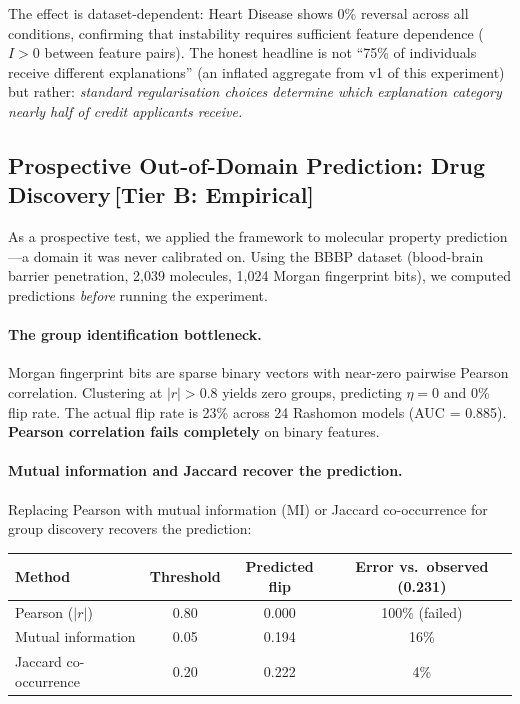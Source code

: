 \documentclass[11pt,a4paper]{article}
\begin{document}
The effect is dataset-dependent: Heart Disease shows 0\% reversal across all conditions, confirming that instability requires sufficient feature dependence ($I > 0$ between feature pairs). The honest headline is not ``75\% of individuals receive different explanations'' (an inflated aggregate from v1 of this experiment) but rather: \emph{standard regularisation choices determine which explanation category nearly half of credit applicants receive.}

\subsection{Prospective Out-of-Domain Prediction: Drug Discovery\,\textnormal{\normalsize[Tier B: Empirical]}}
\label{sec:drug-discovery}

As a prospective test, we applied the framework to molecular property prediction---a domain it was never calibrated on. Using the BBBP dataset (blood-brain barrier penetration, 2{,}039 molecules, 1{,}024 Morgan fingerprint bits), we computed predictions \emph{before} running the experiment.

\paragraph{The group identification bottleneck.}
Morgan fingerprint bits are sparse binary vectors with near-zero pairwise Pearson correlation. Clustering at $|r| > 0.8$ yields zero groups, predicting $\eta = 0$ and 0\% flip rate. The actual flip rate is 23\% across 24 Rashomon models (AUC = 0.885). \textbf{Pearson correlation fails completely} on binary features.

\paragraph{Mutual information and Jaccard recover the prediction.}
Replacing Pearson with mutual information (MI) or Jaccard co-occurrence for group discovery recovers the prediction:

\begin{center}
\small
\begin{tabular}{lccc}
\toprule
Method & Threshold & Predicted flip & Error vs.\ observed (0.231) \\
\midrule
Pearson ($|r|$) & 0.80 & 0.000 & 100\% (failed) \\
Mutual information & 0.05 & 0.194 & 16\% \\
Jaccard co-occurrence & 0.20 & 0.222 & 4\% \\
\bottomrule
\end{tabular}
\end{center}
\end{document}
